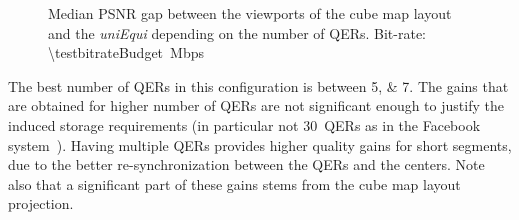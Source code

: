 \begin{figure}
\centering

\caption{Median \acs{PSNR} gap between the viewports of the cube map layout and the \textit{uniEqui} depending
on the number of \acp{QER}.
Bit-rate: \SI{\testbitrateBudget}{\mega bps}}
\label{fig:QEC}
\end{figure}

The best number of \acp{QER} in this configuration is between
\numlist{5;7}. The gains that are obtained for higher number of
\acp{QER} are not significant enough to justify the induced storage
requirements (in particular not $30$~\acp{QER} as in the Facebook
system~\cite{facebook}). Having multiple  \acp{QER} provides higher
quality gains for short segments, due to the better re-synchronization
between the \acp{QER} and the \FoV{} centers. Note also that a
significant part of these gains stems from the cube map layout
projection.
